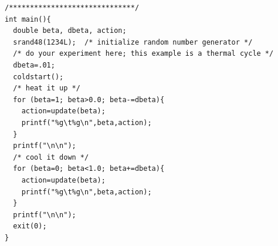 \begin{lstlisting}
/******************************/
int main(){
  double beta, dbeta, action;
  srand48(1234L);  /* initialize random number generator */
  /* do your experiment here; this example is a thermal cycle */
  dbeta=.01;
  coldstart();
  /* heat it up */
  for (beta=1; beta>0.0; beta-=dbeta){
    action=update(beta);
    printf("%g\t%g\n",beta,action); 
  }
  printf("\n\n");
  /* cool it down */
  for (beta=0; beta<1.0; beta+=dbeta){
    action=update(beta);
    printf("%g\t%g\n",beta,action); 
  }
  printf("\n\n");
  exit(0);
}

\end{lstlisting}



